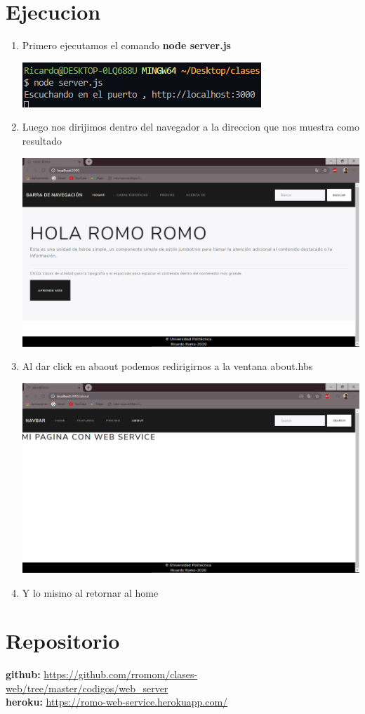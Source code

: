\documentclass{report}
\begin{document}
\section{Ejecucion}
\begin{enumerate}
  \item Primero ejecutamos el comando \textbf{node server.js}
  \begin{center}
    \includegraphics[scale=1]{eje1.PNG}
   \end{center}
  \item Luego nos dirijimos dentro del navegador a la direccion que nos muestra como resultado
  \begin{center}
    \includegraphics[scale=0.3]{eje2.PNG}
   \end{center}
  \item Al dar click en abaout podemos redirigirnos a la ventana about.hbs
  \begin{center}
    \includegraphics[scale=0.3]{eje3.PNG}
   \end{center}
  \item Y lo mismo al retornar al home
\end{enumerate}
\section{Repositorio}
\textbf{github:} \url{https://github.com/rromom/clases-web/tree/master/codigos/web_server}
\\
\textbf{heroku: }\url{https://romo-web-service.herokuapp.com/}
\end{document}
